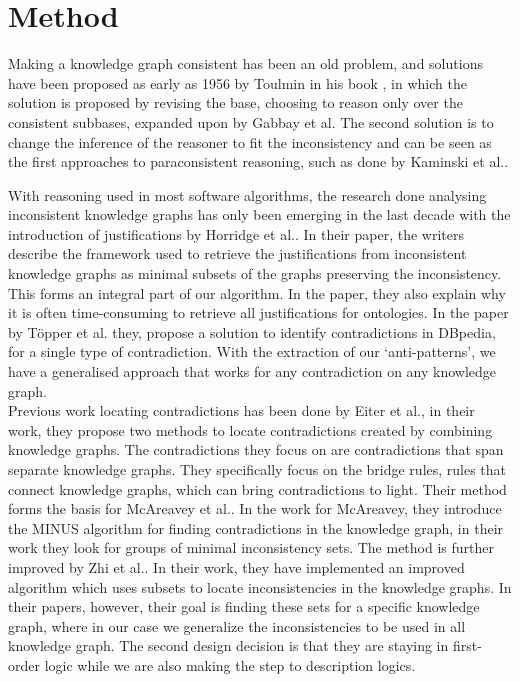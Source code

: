 \documentclass[11pt,letterpaper ,oneside ]{book}
\begin{document}
	\section{Method}
	Making a knowledge graph consistent has been an old problem, and solutions have been proposed as early as 1956 by Toulmin in his book \cite{toulmin:1956}, in which the solution is proposed by revising the base, choosing to reason only over the consistent subbases, expanded upon by Gabbay et al\cite{Gabbay:1994}. The second solution is to change the inference of the reasoner to fit the inconsistency and can be seen as the first approaches to paraconsistent reasoning, such as done by Kaminski et al.\cite{Kaminski:2015}.
	
	With reasoning used in most software algorithms, the research done analysing inconsistent knowledge graphs has only been emerging in the last decade with the introduction of justifications by Horridge et al.\cite{Horridge:2009}. In their paper, the writers describe the framework used to retrieve the justifications from inconsistent knowledge graphs as minimal subsets of the graphs preserving the inconsistency. This forms an integral part of our algorithm. In the paper, they also explain why it is often time-consuming to retrieve all justifications for ontologies. In the paper by T\"{o}pper et al.\cite{Topper:2012} they, propose a solution to identify contradictions in DBpedia, for a single type of contradiction. With the extraction of our `anti-patterns', we have a generalised approach that works for any contradiction on any knowledge graph. \\
	
	Previous work locating contradictions has been done by Eiter et al.\cite{Eiter:2010}, in their work, they propose two methods to locate contradictions created by combining knowledge graphs. The contradictions they focus on are contradictions that span separate knowledge graphs. They specifically focus on the bridge rules, rules that connect knowledge graphs, which can bring contradictions to light. Their method forms the basis for McAreavey et al.\cite{McAreavey:2014}. In the work for McAreavey, they introduce the MINUS algorithm for finding contradictions in the knowledge graph, in their work they look for groups of minimal inconsistency sets. The method is further improved by Zhi et al.\cite{Zhi:2015}. In their work, they have implemented an improved algorithm which uses subsets to locate inconsistencies in the knowledge graphs. In their papers, however, their goal is finding these sets for a specific knowledge graph, where in our case we generalize the inconsistencies to be used in all knowledge graph. The second design decision is that they are staying in first-order logic while we are also making the step to description logics.
	
\end{document}
